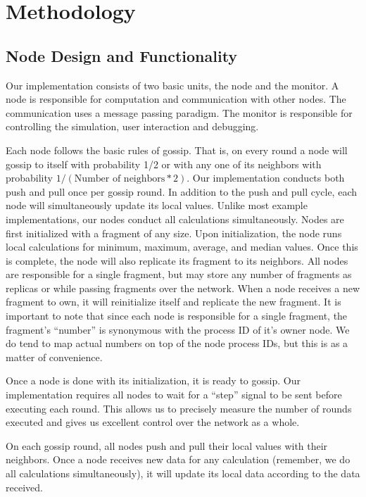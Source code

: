 \section{Methodology}
\subsection{Node Design and Functionality}
Our implementation consists of two basic units, the node and the monitor. A node is responsible for computation and communication with other nodes. The communication uses a message passing paradigm. The monitor is responsible for controlling the simulation, user interaction and debugging.

Each node follows the basic rules of gossip. That is, on every round a node will gossip to itself with probability 1/2 or with any one of its neighbors with probability $1/(\textrm{Number of neighbors} * 2)$. Our implementation conducts both push and pull once per gossip round. In addition to the push and pull cycle, each node will simultaneously update its local values. Unlike most example implementations, our nodes conduct all calculations simultaneously.
Nodes are first initialized with a fragment of any size. Upon initialization, the node runs local calculations for minimum, maximum, average, and median values. Once this is complete, the node will also replicate its fragment to its neighbors. All nodes are responsible for a single fragment, but may store any number of fragments as replicas or while passing fragments over the network. When a node receives a new fragment to own, it will reinitialize itself and replicate the new fragment. It is important to note that since each node is responsible for a single fragment, the fragment's “number” is synonymous with the process ID of it's owner node. We do tend to map actual numbers on top of the node process IDs, but this is as a matter of convenience.

Once a node is done with its initialization, it is ready to gossip. Our implementation requires all nodes to wait for a “step” signal to be sent before executing each round. This allows us to precisely measure the number of rounds executed and gives us excellent control over the network as a whole.

On each gossip round, all nodes push and pull their local values with their neighbors. Once a node receives new data for any calculation (remember, we do all calculations simultaneously), it will update its local data according to the data received.

